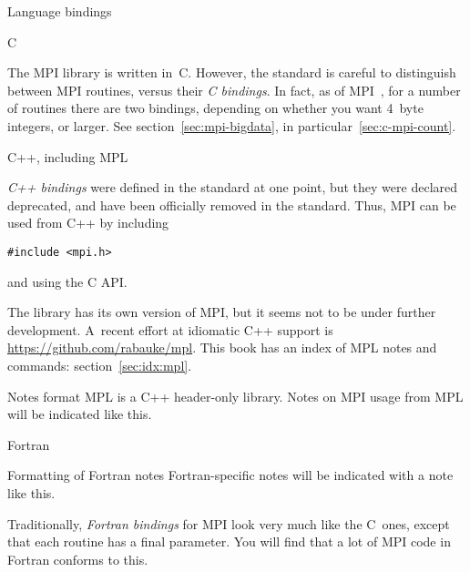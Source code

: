  {Language bindings}

 {C}

The MPI library is written in~C. 
However, the standard is careful to distinguish between MPI routines,
versus their \emph{C bindings}.
In fact, as of MPI~,
for a number of routines there are two bindings,
depending on whether you want 4~byte integers,
or larger.
See section~\ref{sec:mpi-bigdata},
in particular~\ref{sec:c-mpi-count}.


 {C++, including MPL}

\emph{C++ bindings} were defined in the standard at one point,
but they were declared deprecated,
and have been officially removed in the 
 standard.
Thus, MPI can be used from C++ by including
\begin{verbatim}
#include <mpi.h>
\end{verbatim}
and using the C API.

The  library has its own version of MPI, but it seems
not to be under further development.  A~recent
effort at idiomatic C++ support is 
\url{https://github.com/rabauke/mpl}.
This book has an index of \ac{MPL} notes and commands:
section~\ref{sec:idx:mpl}.

\begin{mplnote}{Notes format}
MPL
is a C++ header-only library.
Notes on MPI usage from MPL will be indicated like this.
\end{mplnote}


 {Fortran}

\begin{fortrannote}{Formatting of Fortran notes}
  Fortran-specific notes will be indicated with a note like this.
\end{fortrannote}

Traditionally, \emph{Fortran bindings} for MPI look very much like the C~ones,
except that each routine has a final 
parameter.
You will find that a lot of MPI code in Fortran conforms to this.

